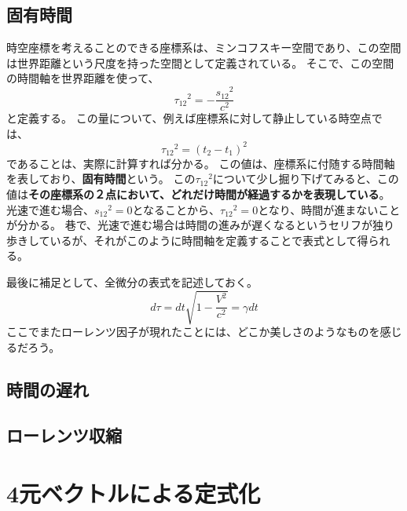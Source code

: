 \documentclass[a4paper]{jsreport}
\begin{document}
        \section{固有時間}
            時空座標を考えることのできる座標系は、ミンコフスキー空間であり、この空間は世界距離という尺度を持った空間として定義されている。
            そこで、この空間の時間軸を世界距離を使って、
            \begin{equation}
                {\tau_{12}}^2 = - \frac{{s_{12}}^2}{c^2} 
            \end{equation}
            と定義する。
            この量について、例えば座標系に対して静止している時空点では、
            \begin{equation}
                {\tau_{12}}^2 = (t_2 - t_1)^2
            \end{equation}
            であることは、実際に計算すれば分かる。
            この値は、座標系に付随する時間軸を表しており、\textbf{固有時間}という。
            この${\tau_{12}}^2$について少し掘り下げてみると、この値は\textbf{その座標系の２点において、どれだけ時間が経過するかを表現している}。
            光速で進む場合、${s_{12}}^2 = 0$となることから、${\tau_{12}}^2 = 0$となり、時間が進まないことが分かる。
            巷で、光速で進む場合は時間の進みが遅くなるというセリフが独り歩きしているが、それがこのように時間軸を定義することで表式として得られる。\par
            最後に補足として、全微分の表式を記述しておく。
            \begin{equation}
                d\tau = dt \sqrt{1 - \frac{V^2}{c^2}} = \gamma dt
            \end{equation}
            ここでまたローレンツ因子が現れたことには、どこか美しさのようなものを感じるだろう。

        \section{時間の遅れ}

        \section{ローレンツ収縮}  
        
    \chapter{4元ベクトルによる定式化}
\end{document}
